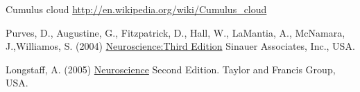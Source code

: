 

Cumulus cloud \underline{http://en.wikipedia.org/wiki/Cumulus\_cloud}

Purves, D., Augustine, G., Fitzpatrick, D., Hall, W., LaMantia, A., McNamara, J.,Williamos, S. (2004) \underline{Neuroscience:Third Edition} Sinauer Associates, Inc., USA.

Longstaff, A. (2005) \underline{Neuroscience} Second Edition. Taylor and Francis Group, USA.

